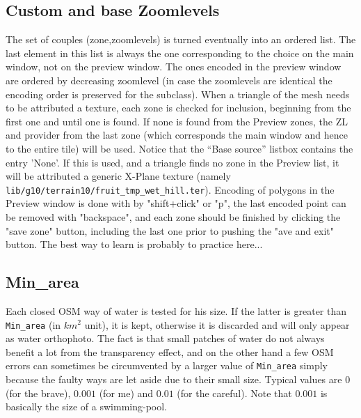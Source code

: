 \documentclass[12pt]{article}
\begin{document}
\subsection{Custom and base Zoomlevels}
The set of couples (zone,zoomlevels) is turned eventually into an ordered list. The last element in this list is always the one corresponding to the choice on the main window, not on the preview
window. The ones encoded in the preview window are ordered by decreasing zoomlevel (in case the zoomlevels are identical the encoding order is preserved for the subclass). When a triangle of the mesh needs to be attributed a texture, each zone is checked for inclusion, beginning  from the first one and until one is found.
If none is found from the Preview zones, the ZL and provider from the last zone (which corresponds the main window and hence to the entire tile) will be used. Notice that the ``Base source'' listbox contains the entry 'None'. If this is used, and a triangle finds no zone in the Preview list, it will be attributed a generic X-Plane texture (namely {\tt lib/g10/terrain10/fruit\_tmp\_wet\_hill.ter}). Encoding of polygons in the Preview window is done with by "shift+click" or "p", the last encoded point can be removed with "backspace", and each zone should be finished by clicking the "save zone" button, including the last one prior to pushing the "ave and exit" button. The best way to learn is probably to practice here...


\subsection{Min\_area}
Each closed OSM way of water is tested for his size. If the latter is greater than {\tt Min\_area} (in $km^2$ unit), it is kept, otherwise it is discarded and will only appear as water orthophoto.
The fact is that small patches of water do not always benefit a lot from the transparency effect,  and on the other hand a few OSM errors can sometimes be circumvented by a larger value of {\tt Min\_area} simply because the faulty ways are let aside due to their small size.
Typical values are $0$ (for the brave), $0.001$ (for me) and $0.01$ (for the careful). Note that $0.001$ is basically the size of a swimming-pool.
\end{document}
